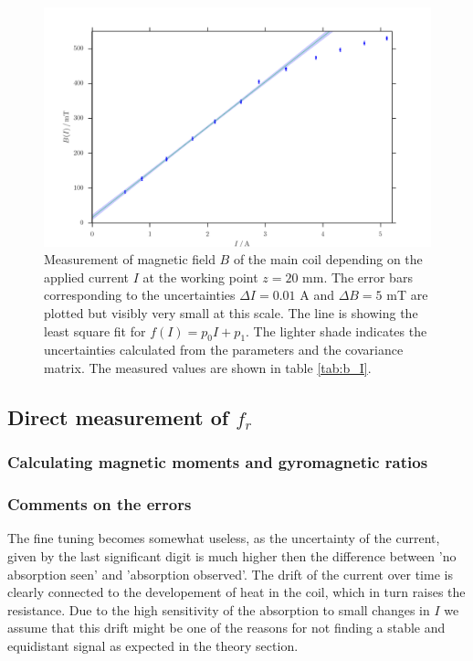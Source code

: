 \begin{figure}[H]
    \includegraphics[width=\textwidth]{figures/b_I.pdf}
    \caption{   
        Measurement of magnetic field $B$ of the main coil depending on the applied current 
        $I$ at the working point $z = 20$ mm. The error bars corresponding 
        to the uncertainties $\Delta I = 0.01$ A 
        and $\Delta B = 5$ mT are plotted but visibly very small at this scale. 
        The line is showing the least square fit for $f(I) = p_0 I + p_1$. The 
        lighter shade indicates the uncertainties calculated from the parameters 
        and the covariance matrix. 
        The measured values are shown in table \ref{tab:b_I}.
        }
    \label{fig:b_I}
\end{figure}


\subsection{Direct measurement of $f_r$}
\subsubsection{Calculating magnetic moments and gyromagnetic ratios}





\subsubsection{Comments on the errors}
The fine tuning becomes somewhat useless, as the uncertainty of the current, given by the last 
significant digit is much higher then the difference between 'no absorption seen' and 
'absorption observed'. The drift of the current over time is clearly connected to the developement 
of heat in the coil, which in turn raises the resistance. Due to the high sensitivity of the absorption 
to small changes in $I$ we assume that this drift might be one of the reasons for not finding 
a stable and equidistant signal as expected in the theory section. 





